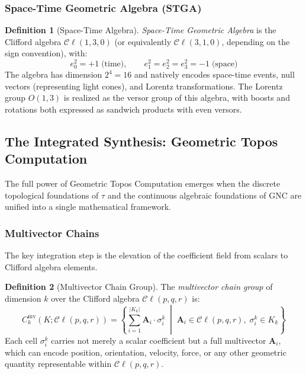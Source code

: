 \documentclass[manuscript, nonacm, review=false]{acmart}
\theoremstyle{definition}
\newtheorem{definition}{Definition}[section]
\theoremstyle{plain}
\newcommand{\Cl}{\mathcal{C}\!\ell}
\newcommand{\toposLang}{\ensuremath{\tau}\text{-Lang}}
\begin{document}
\subsubsection{Space-Time Geometric Algebra (STGA)}

\begin{definition}[Space-Time Algebra]
\label{def:stga}
\emph{Space-Time Geometric Algebra} is the Clifford algebra $\Cl(1,3,0)$ (or equivalently $\Cl(3,1,0)$, depending on the sign convention), with:
\begin{equation}
    e_0^2 = +1 \;\text{(time)}, \qquad e_1^2 = e_2^2 = e_3^2 = -1 \;\text{(space)}
\end{equation}
The algebra has dimension $2^4 = 16$ and natively encodes space-time events, null vectors (representing light cones), and Lorentz transformations. The Lorentz group $O(1,3)$ is realized as the versor group of this algebra, with boosts and rotations both expressed as sandwich products with even versors.
\end{definition}


\subsection{The Integrated Synthesis: Geometric Topos Computation}
\label{subsec:synthesis}

The full power of Geometric Topos Computation emerges when the discrete topological foundations of \toposLang{} and the continuous algebraic foundations of GNC are unified into a single mathematical framework.

\subsubsection{Multivector Chains}

The key integration step is the elevation of the coefficient field from scalars to Clifford algebra elements.

\begin{definition}[Multivector Chain Group]
\label{def:mv_chain}
The \emph{multivector chain group} of dimension $k$ over the Clifford algebra $\Cl(p,q,r)$ is:
\begin{equation}
    C_k^{\text{mv}}(K; \Cl(p,q,r)) = \left\{ \sum_{i=1}^{|K_k|} \mathbf{A}_i \cdot \sigma_i^k \;\middle|\; \mathbf{A}_i \in \Cl(p,q,r),\; \sigma_i^k \in K_k \right\}
    \label{eq:mv_chain}
\end{equation}
Each cell $\sigma_i^k$ carries not merely a scalar coefficient but a full multivector $\mathbf{A}_i$, which can encode position, orientation, velocity, force, or any other geometric quantity representable within $\Cl(p,q,r)$.
\end{definition}
\end{document}
